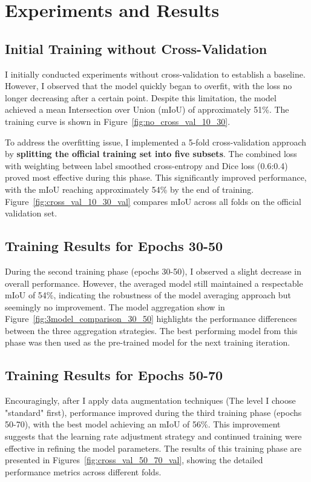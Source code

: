 \documentclass[]{article}
\begin{document}
\section{Experiments and Results}\label{sec:Experiments}
\subsection{Initial Training without Cross-Validation}
I initially conducted experiments without cross-validation to establish a baseline. However, I observed that the model quickly began to overfit, with the loss no longer decreasing after a certain point. Despite this limitation, the model achieved a mean Intersection over Union (mIoU) of approximately 51\%. The training curve is shown in Figure~\ref{fig:no_cross_val_10_30}.

To address the overfitting issue, I implemented a 5-fold cross-validation approach by \textbf{splitting the official training set into five subsets}. The combined loss with weighting between label smoothed cross-entropy and Dice loss (0.6:0.4) proved most effective during this phase. This significantly improved performance, with the mIoU reaching approximately 54\% by the end of training. Figure~\ref{fig:cross_val_10_30_val} compares mIoU across all folds on the official validation set.

\subsection{Training Results for Epochs 30-50}
During the second training phase (epochs 30-50), I observed a slight decrease in overall performance. However, the averaged model still maintained a respectable mIoU of 54\%, indicating the robustness of the model averaging approach but seemingly no improvement. The model aggregation show in Figure~\ref{fig:3model_comparison_30_50} highlights the performance differences between the three aggregation strategies. The best performing model from this phase was then used as the pre-trained model for the next training iteration.


\subsection{Training Results for Epochs 50-70}
Encouragingly, after I apply data augmentation techniques (The level I choose "standard" first), performance improved during the third training phase (epochs 50-70), with the best model achieving an mIoU of 56\%. This improvement suggests that the learning rate adjustment strategy and continued training were effective in refining the model parameters. The results of this training phase are presented in Figures~\ref{fig:cross_val_50_70_val}, showing the detailed performance metrics across different folds.
\end{document}
